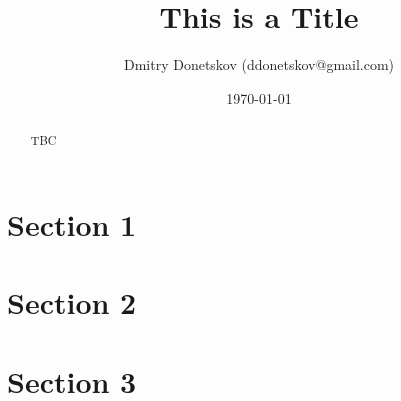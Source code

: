 \documentclass[a4paper,11pt]{article}
\title{\vspace{-1.5cm}This is a Title}
\author{Dmitry Donetskov (ddonetskov@gmail.com)}
\date{\today}
\begin{document}
\maketitle

\begin{abstract}

TBC

\end{abstract}

\section{Section 1}

\section{Section 2}

\section{Section 3}

\end{document}
